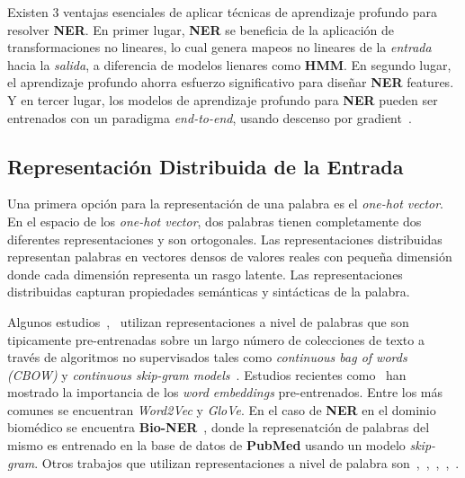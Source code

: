 Existen 3 ventajas esenciales de aplicar t\'ecnicas de aprendizaje profundo para resolver \textbf{NER}. En primer lugar, \textbf{NER} se beneficia de la aplicaci\'on de transformaciones no lineares, lo cual genera mapeos no lineares de la \emph{entrada} hacia la \emph{salida}, a diferencia de modelos lienares como \textbf{HMM}. En segundo lugar, el aprendizaje profundo ahorra esfuerzo significativo para dise\~nar \textbf{NER} features. Y en tercer lugar, los modelos de aprendizaje profundo para \textbf{NER} pueden ser entrenados con un paradigma \emph{end-to-end}, usando descenso por gradient~\cite{li2018survey}.

\subsection{Representaci\'on Distribuida de la Entrada}

Una primera opci\'on para la representaci\'on de una palabra es el \emph{one-hot vector}. En el espacio de los \emph{one-hot vector}, dos palabras tienen completamente dos diferentes representaciones y son ortogonales. Las representaciones distribuidas representan palabras en vectores densos de valores reales con peque\~na dimensi\'on donde cada dimensi\'on representa un rasgo latente. Las representaciones distribuidas capturan propiedades sem\'anticas y sint\'acticas de la palabra.    

Algunos estudios~\cite{nguyen2016toward},~\cite{strubell2017fast} utilizan representaciones a nivel de palabras que son tipicamente pre-entrenadas sobre un largo n\'umero de colecciones de texto a trav\'es de algoritmos no supervisados tales como \emph{continuous bag of words (CBOW)} y \emph{continuous skip-gram models}~\cite{mikolov2013efficient}. Estudios recientes como~\cite{yang2018design} han mostrado la importancia de los \emph{word embeddings} pre-entrenados. Entre los m\'as comunes se encuentran \emph{Word2Vec} y \emph{GloVe}. En el caso de \textbf{NER} en el dominio biom\'edico se encuentra \textbf{Bio-NER}~\cite{yao2015biomedical}, donde la represenatci\'on de palabras del mismo es entrenado en la base de datos de \textbf{PubMed} usando un modelo \emph{skip-gram}. Otros trabajos que utilizan  representaciones a nivel de palabra son~\cite{zhai2017neural},~\cite{zhou2017joint},~\cite{ma2016end},~\cite{li2017leveraging},~\cite{wang2018code}.

